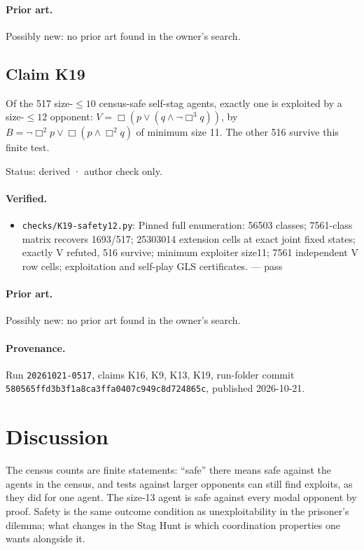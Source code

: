 \documentclass{article}
\begin{document}
\paragraph{Prior art.} Possibly new: no prior art found in the owner's search.

\subsection*{Claim K19}

Of the 517 size-$\le10$ census-safe self-stag agents, exactly one is exploited by a size-$\le12$ opponent: $V=\Box(p\lor(q\land\neg\Box^3q))$, by $B=\neg\Box^2p\lor\Box(p\land\Box^2q)$ of minimum size 11. The other 516 survive this finite test.

Status: derived · author check only.

\paragraph{Verified.}
\begin{itemize}
\item \texttt{checks/K19-safety12.py}: Pinned full enumeration: 56503 classes; 7561-class matrix recovers 1693/517; 25303014 extension cells at exact joint fixed states; exactly V refuted, 516 survive; minimum exploiter size11; 7561 independent V row cells; exploitation and self-play GLS certificates. --- pass
\end{itemize}

\paragraph{Prior art.} Possibly new: no prior art found in the owner's search.


\paragraph{Provenance.}
Run \texttt{20261021-0517}, claims K16, K9, K13, K19, run-folder commit \texttt{580565ffd3b3f1a8ca3ffa0407c949c8d724865c}, published 2026-10-21.

\section{Discussion}

The census counts are finite statements: ``safe'' there means safe against the agents in the census,
and tests against larger opponents can still find exploits, as they did for one agent.
The size-13 agent is safe against every modal opponent by proof. Safety is the same outcome
condition as unexploitability in the prisoner's dilemma; what changes in the Stag Hunt is which
coordination properties one wants alongside it.
\end{document}
